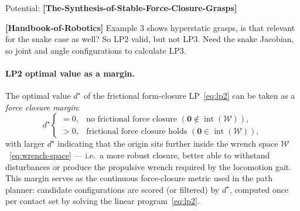 Potential: \textbf{[The-Synthesis-of-Stable-Force-Closure-Grasps]}

\textbf{[Handbook-of-Robotics]} Example 3 shows hyperstatic grasps, is that
relevant for the snake case as well? So LP2 valid, but not LP3. Need the
snake Jacobian, so joint and angle configurations to calculate LP3.

\paragraph{LP2 optimal value as a margin.}
The optimal value $d^\star$ of the frictional form-closure
LP~\eqref{eq:lp2} can be taken as a \emph{force closure margin}:
\begin{equation}
d^\star
\begin{cases}
= 0, & \text{no frictional force closure } (\mathbf{0} \notin \operatorname{int}(\mathcal{W})), \\
> 0, & \text{frictional force closure holds } (\mathbf{0} \in \operatorname{int}(\mathcal{W})),
\end{cases}
\label{eq:fc-margin-interpretation}
\end{equation}
with larger $d^\star$ indicating that the origin sits further inside the
wrench space $\mathcal{W}$~\eqref{eq:wrench-space} --- i.e.\ a more robust
closure, better able to withstand disturbances or produce the propulsive
wrench required by the locomotion gait. This margin serves as the continuous
force-closure metric used in the path planner: candidate configurations are
scored (or filtered) by $d^\star$, computed once per contact set by solving
the linear program~\eqref{eq:lp2}.
